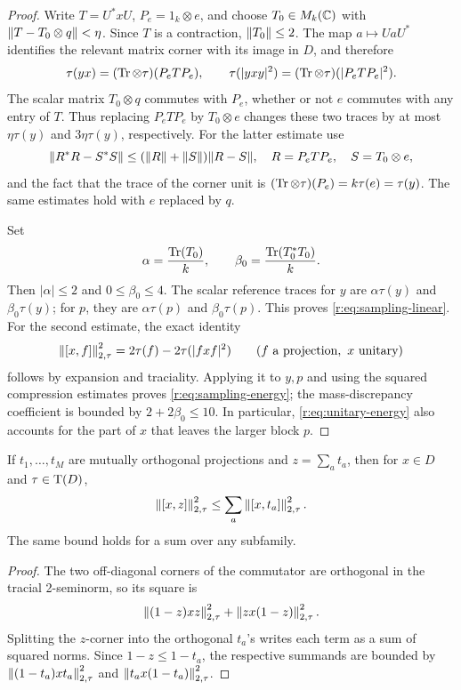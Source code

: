 \begin{proof}
Write \(T=U^*xU\), \(P_e=1_k\otimes e\), and choose \(T_0\in M_k(\mathbb C)\)
with \(\lVert T-T_0\otimes q\rVert<\eta\).
Since \(T\) is a contraction, \(\lVert T_0\rVert\leq2\).
The map \(a\mapsto UaU^*\) identifies the relevant matrix corner with
its image in \(D\), and therefore
\[
 \tau(yx)=(\operatorname{Tr}\otimes\tau)(P_eTP_e),\qquad
 \tau(|yxy|^2)=(\operatorname{Tr}\otimes\tau)(|P_eTP_e|^2).
\]
The scalar matrix \(T_0\otimes q\) commutes with \(P_e\), whether or not
\(e\) commutes with any entry of \(T\).
Thus replacing \(P_eTP_e\) by \(T_0\otimes e\) changes these two traces
by at most \(\eta\tau(y)\) and \(3\eta\tau(y)\), respectively.
For the latter estimate use
\[
 \lVert R^*R-S^*S\rVert\leq(\lVert R\rVert+\lVert S\rVert)\lVert R-S\rVert,
 \quad R=P_eTP_e,\quad S=T_0\otimes e,
\]
and the fact that the trace of the corner unit is
\((\operatorname{Tr}\otimes\tau)(P_e)=k\tau(e)=\tau(y)\).
The same estimates hold with \(e\) replaced by \(q\).

Set
\[
 \alpha=\frac{\operatorname{Tr}(T_0)}{k},\qquad
 \beta_0=\frac{\operatorname{Tr}(T_0^*T_0)}{k}.
\]
Then \(|\alpha|\leq2\) and \(0\leq\beta_0\leq4\).
The scalar reference traces for \(y\) are
\(\alpha\tau(y)\) and \(\beta_0\tau(y)\); for \(p\), they are
\(\alpha\tau(p)\) and \(\beta_0\tau(p)\).
This proves \eqref{r:eq:sampling-linear}.
For the second estimate, the exact identity
\begin{equation}\label{r:eq:unitary-energy}
 \left\|[x,f]\right\|_{2,\tau}^2
 =2\tau(f)-2\tau(|fxf|^2)
 \qquad(f\text{ a projection},\ x\text{ unitary})
\end{equation}
follows by expansion and traciality. Applying it to \(y,p\) and using
the squared compression estimates proves \eqref{r:eq:sampling-energy};
the mass-discrepancy coefficient is bounded by
\(2+2\beta_0\leq10\).
In particular, \eqref{r:eq:unitary-energy} also accounts for the part of
\(x\) that leaves the larger block \(p\).
\end{proof}

\begin{lemma}\label{r:packing:orthogonal}
If \(t_1,\ldots,t_M\) are mutually orthogonal projections and
\(z=\sum_a t_a\), then for \(x\in D\) and \(\tau\in\operatorname T(D)\),
\[
 \left\|[x,z]\right\|_{2,\tau}^2
 \leq\sum_a\left\|[x,t_a]\right\|_{2,\tau}^2.
\]
The same bound holds for a sum over any subfamily.
\end{lemma}

\begin{proof}
The two off-diagonal corners of the commutator are orthogonal in the
tracial 2-seminorm, so its square is
\[
 \left\|(1-z)xz\right\|_{2,\tau}^2+\left\|zx(1-z)\right\|_{2,\tau}^2.
\]
Splitting the \(z\)-corner into the orthogonal \(t_a\)'s writes each
term as a sum of squared norms. Since \(1-z\leq1-t_a\), the respective
summands are bounded by
\(\left\|(1-t_a)xt_a\right\|_{2,\tau}^2\) and
\(\left\|t_ax(1-t_a)\right\|_{2,\tau}^2\).
\end{proof}

